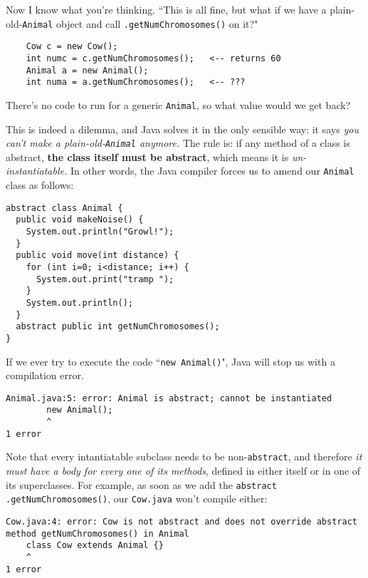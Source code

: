 \begin{samepage}
Now I know what you're thinking. ``This is all fine, but what if we have a
plain-old-\texttt{Animal} object and call \texttt{.getNumChromosomes()} on
it?" 

\begin{verbatim}
    Cow c = new Cow();
    int numc = c.getNumChromosomes();   <-- returns 60
    Animal a = new Animal();
    int numa = a.getNumChromosomes();   <-- ???
\end{verbatim}

There's no code to run for a generic \texttt{Animal}, so what value would we
get back?
\end{samepage}

This is indeed a dilemma, and Java solves it in the only sensible way: it says
\textit{you can't make a plain-old-\texttt{Animal} anymore.} The rule is: if
any method of a class is abstract, \textbf{the class itself must be abstract},
which means it is \textit{un-instantiatable.} In other words, the Java
compiler forces us to amend our \texttt{Animal} class as follows:

\begin{Verbatim}[fontsize=\scriptsize,samepage=true,frame=single]
abstract class Animal {                         
  public void makeNoise() {            
    System.out.println("Growl!");      
  }                                    
  public void move(int distance) {     
    for (int i=0; i<distance; i++) {   
      System.out.print("tramp ");      
    }                                  
    System.out.println();              
  }
  abstract public int getNumChromosomes();
}                                      
\end{Verbatim}

If we ever try to execute the code ``\texttt{new Animal()}", Java will stop us
with a compilation error.

\begin{Verbatim}[fontsize=\scriptsize,samepage=true]
Animal.java:5: error: Animal is abstract; cannot be instantiated
        new Animal();
        ^
1 error
\end{Verbatim}

\begin{samepage} Note that every intantiatable subclass needs to be
non-\texttt{abstract}, and therefore \textit{it must have a body for every one
of its methods}, defined in either itself or in one of its superclasses. For
example, as soon as we add the \texttt{abstract}
\texttt{.getNumChromosomes()}, our \texttt{Cow.java} won't compile either:

\scriptsize
\begin{Verbatim}[fontsize=\scriptsize,samepage=true]
Cow.java:4: error: Cow is not abstract and does not override abstract
method getNumChromosomes() in Animal
    class Cow extends Animal {}
    ^
1 error
\end{Verbatim}
\normalsize
\end{samepage}


